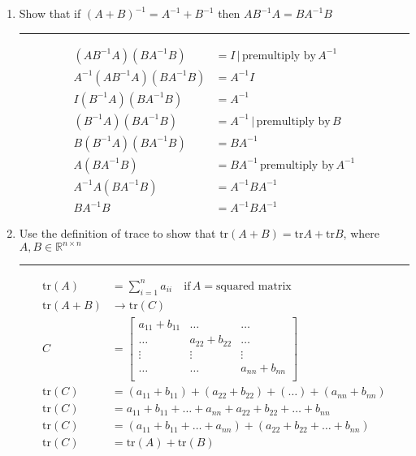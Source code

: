 \documentclass[12pt]{article}
\begin{document}
\begin{enumerate}
    \item Show that if $(A + B)^{-1} = A^{-1} + B^{-1}$ then $A B^{-1} A = B A^{-1} B$
    
    \noindent\rule{\linewidth}{1pt}

    \begin{align*}
                (A B^{-1} A )( B A^{-1} B ) &= I \, | \, \textrm{premultiply by} \, A^{-1} \\
         A^{-1} (A B^{-1} A )( B A^{-1} B ) &= A^{-1} I \\
               I ( B^{-1} A )( B A^{-1} B ) &= A^{-1} \\
                 ( B^{-1} A )( B A^{-1} B ) &= A^{-1} \, | \, \textrm{premultiply by} \, B \\
               B ( B^{-1} A )( B A^{-1} B ) &= B A^{-1} \\
                           A ( B A^{-1} B ) &= B A^{-1} \, \textrm{premultiply by} \, A^{-1} \\
                    A^{-1} A ( B A^{-1} B ) &= A^{-1} B A^{-1} \\
                                 B A^{-1} B &= A^{-1} B A^{-1}
    \end{align*}

    \item Use the definition of trace to show that $\textrm{tr}(A + B) = \textrm{tr}A + \textrm{tr}B$, where $A, B \in \mathbb{R}^{n \times n}$
    
    \noindent\rule{\linewidth}{1pt}

    \begin{align*}
        \textrm{tr}(A) &= \sum_{i=1}^{n} a_{ii} \quad \textrm{if} \, A = \textrm{squared matrix} \\
        \textrm{tr}(A + B) &\rightarrow \textrm{tr}(C) \\
        C &= 
        \begin{bmatrix}
            a_{11} + b_{11}  &   \dots            &   \dots            \\
            \dots            &   a_{22} + b_{22}  &   \dots            \\
            \vdots           &   \vdots           &   \vdots           \\   
            \dots            &   \dots            &   a_{nn} + b_{nn}  \\
        \end{bmatrix} \\
        \textrm{tr}(C) &= ( a_{11} + b_{11}  ) + ( a_{22} + b_{22} ) + ( \dots ) + ( a_{nn} + b_{nn}  ) \\
        \textrm{tr}(C) &= a_{11} + b_{11} + \dots +  a_{nn}  +  a_{22} + b_{22}  +  \dots   + b_{nn}   \\
        \textrm{tr}(C) &= ( a_{11} + b_{11} + \dots +  a_{nn} ) + ( a_{22} + b_{22}  +  \dots   + b_{nn} )   \\
        \textrm{tr}(C) &= \textrm{tr}(A) + \textrm{tr}(B)
    \end{align*}   


\end{enumerate}
\end{document}
